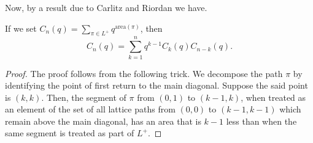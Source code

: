 Now, by a result due to Carlitz and Riordan we have.
\begin{theorem}
    If we set $C_n(q)=\sum_{\pi\in L^+}q^{\text{area}(\pi)}$, then \[
    C_n(q) = \sum_{k=1}^n q^{k-1} C_k(q) C_{n-k}(q).
    \]
\end{theorem}
\begin{proof}
The proof follows from the following trick. We decompose the path \( \pi \) by identifying the point of first return to the main diagonal. Suppose the said point is \( (k, k) \). Then, the segment of \( \pi \) from \( (0, 1) \) to \( (k-1, k) \), when treated as an element of the set of all lattice paths from $(0,0)$ to $(k-1,k-1)$ which remain above the main diagonal, has an area that is \( k - 1 \) less than when the same segment is treated as part of $L^+$.
\end{proof}
\endinput
